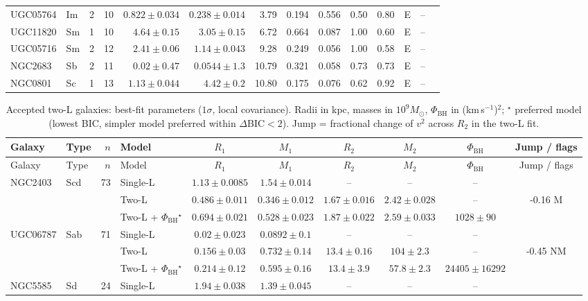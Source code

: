 \documentclass[9pt]{extarticle}
\begin{document}
{\begin{longtable}{lllrrrrrrrrcrl}
UGC05764 & Im & 2 & 10 & $0.822\pm0.034$ & $0.238\pm0.014$ & 3.79 & 0.194 & 0.556 & 0.50 & 0.80 & E & -- & \\
UGC11820 & Sm & 1 & 10 & $4.64\pm0.15$ & $3.05\pm0.15$ & 6.72 & 0.664 & 0.087 & 1.00 & 0.60 & E & -- & \\
UGC05716 & Sm & 2 & 12 & $2.41\pm0.06$ & $1.14\pm0.043$ & 9.28 & 0.249 & 0.056 & 1.00 & 0.58 & E & -- & \\
NGC2683 & Sb & 2 & 11 & $0.02\pm0.47$ & $0.0544\pm1.3$ & 10.79 & 0.321 & 0.058 & 0.73 & 0.73 & E & -- & \\
NGC0801 & Sc & 1 & 13 & $1.13\pm0.044$ & $4.42\pm0.2$ & 10.80 & 0.175 & 0.076 & 0.62 & 0.92 & E & -- & \\
\end{longtable}}\clearpage
{\scriptsize\setlength{\tabcolsep}{4pt}
\begin{longtable}{llrlcccccc}
\caption{Accepted two-L galaxies: best-fit parameters ($1\sigma$, local covariance). Radii in kpc, masses in $10^9M_\odot$, $\Phi_\mathrm{BH}$ in (km\,s$^{-1}$)$^2$; $^\star$ preferred model (lowest BIC, simpler model preferred within $\Delta$BIC$<2$). Jump = fractional change of $v^2$ across $R_2$ in the two-L fit.}\\\toprule
Galaxy & Type & $n$ & Model & $R_1$ & $M_1$ & $R_2$ & $M_2$ & $\Phi_\mathrm{BH}$ & Jump / flags\\\midrule\endfirsthead
\toprule Galaxy & Type & $n$ & Model & $R_1$ & $M_1$ & $R_2$ & $M_2$ & $\Phi_\mathrm{BH}$ & Jump / flags\\\midrule\endhead\bottomrule\endfoot
NGC2403 & Scd & 73 & Single-L & $1.13\pm0.0085$ & $1.54\pm0.014$ & -- & -- & -- & \\
 & &  & Two-L & $0.486\pm0.011$ & $0.346\pm0.012$ & $1.67\pm0.016$ & $2.42\pm0.028$ & -- & -0.16 M\\
 & &  & Two-L + $\Phi_\mathrm{BH}$$^\star$ & $0.694\pm0.021$ & $0.528\pm0.023$ & $1.87\pm0.022$ & $2.59\pm0.033$ & $1028\pm90$ & \\
\midrule
UGC06787 & Sab & 71 & Single-L & $0.02\pm0.023$ & $0.0892\pm0.1$ & -- & -- & -- & \\
 & &  & Two-L & $0.156\pm0.03$ & $0.732\pm0.14$ & $13.4\pm0.16$ & $104\pm2.3$ & -- & -0.45 NM\\
 & &  & Two-L + $\Phi_\mathrm{BH}$$^\star$ & $0.214\pm0.12$ & $0.595\pm0.16$ & $13.4\pm3.9$ & $57.8\pm2.3$ & $24405\pm16292$ & \\
\midrule
NGC5585 & Sd & 24 & Single-L & $1.94\pm0.038$ & $1.39\pm0.045$ & -- & -- & -- & \\

\end{longtable}}
\end{document}
